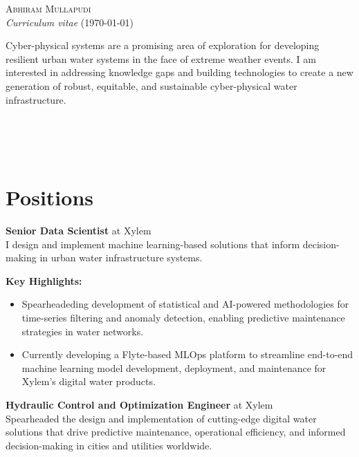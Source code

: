 \documentclass[a4paper,11pt]{article}
\newcommand{\years}[1]{%
  {\reversemarginpar\strut\marginnote{{\small#1}}}%
}
\begin{document}
{\huge \textsc{Abhiram Mullapudi}}\\
{\small \textit{Curriculum vitae} (\today)}\\

\begin{vwcol}[widths={0.78,0.22}]
{\footnotesize Cyber-physical systems are a promising area of exploration for developing resilient urban water
systems in the face of extreme weather events. I am interested in addressing knowledge gaps and building technologies to
create a new generation of robust, equitable, and sustainable cyber-physical water infrastructure.}

{\scriptsize {\\
{\faHome{}}\\
{\faGithub{}}\\}}
\end{vwcol}

\section*{Positions}

\years{2023--}
\textbf{Senior Data Scientist} at Xylem\\

I design and implement machine learning-based solutions that inform decision-making in urban water infrastructure systems.

\vspace{2mm}
{\small \textbf{Key Highlights:}}
\vspace{-2mm}
\begin{itemize}
	\setlength\itemsep{1mm}
	\item  Spearheadeding development of statistical and AI-powered methodologies for
time-series filtering and anomaly detection, enabling predictive maintenance
strategies in water networks.
	\item  Currently developing a Flyte-based MLOps platform to streamline
end-to-end machine learning model development, deployment, and maintenance for
Xylem's digital water products.
\end{itemize}

\years{2020--2023}
\textbf{Hydraulic Control and Optimization Engineer} at Xylem\\

Spearheaded the design and implementation of cutting-edge digital water solutions
that drive predictive maintenance, operational efficiency, and informed
decision-making in cities and utilities worldwide.
\end{document}
